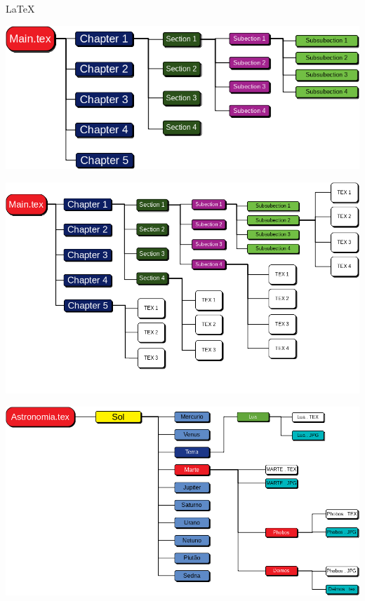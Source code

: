 {\Huge \LaTeX}
\begin{center}
	\includegraphics[width=\linewidth]{./IMG-GIT/SVG/DIAGRAMAS2.png}
\end{center}
\pagebreak

\begin{center}
	\includegraphics[height=\textheight]{./IMG-GIT/SVG/DIAGRAMAS3.png}
\end{center}
\pagebreak

\begin{center}
	\includegraphics[height=\textheight]{./IMG-GIT/SVG/DIAGRAMAS4.png}
\end{center}
\pagebreak

